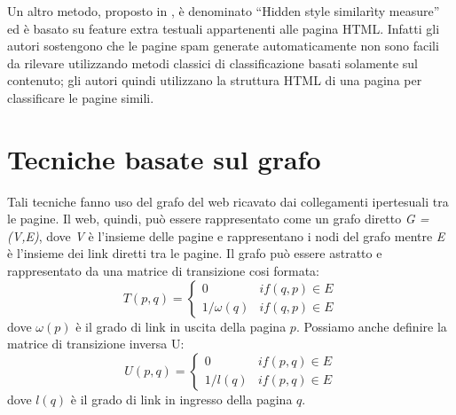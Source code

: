 Un altro metodo, proposto in \cite{DBLP:conf:airweb:UrvoyLF06}, è denominato ``Hidden style similarìty measure'' ed è basato su feature extra testuali appartenenti alle pagina HTML. Infatti gli autori sostengono che le pagine spam generate automaticamente non sono facili da rilevare utilizzando metodi classici di classificazione basati solamente sul contenuto; gli autori quindi utilizzano la struttura HTML di una pagina per classificare le pagine simili.

\section{Tecniche basate sul grafo}
Tali tecniche fanno uso del grafo del web ricavato dai collegamenti ipertesuali tra le pagine. Il web, quindi, può essere rappresentato come un grafo diretto \textit{G = (V,E)}, dove \textit{V} è l'insieme delle pagine e rappresentano i nodi del grafo mentre \textit{E} è l'insieme dei link diretti tra le pagine. Il grafo può essere astratto e rappresentato da una matrice di transizione cosi formata:
\begin{equation}
T(p,q)=\left \{
\begin{array}{cc}
0 & if(q,p) \in E\\
1/\omega(q) & if(q,p) \in E
\end{array}
\right .
\end{equation}
dove \(\omega(p)\) è il grado di link in uscita della pagina \(p\).
Possiamo anche definire la matrice di transizione inversa U:
\begin{equation}
U(p,q)=\left \{
\begin{array}{cc}
0 & if(p,q) \in E\\
1/l(q) & if(p,q) \in E
\end{array}
\right .
\end{equation}
dove \(l(q)\) è il grado di link in ingresso della pagina \(q\).
